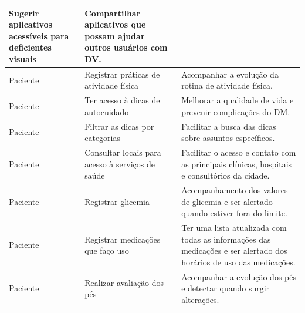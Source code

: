 \begin{quadro}[htb]
\begin{center}
\begin{tabular}{p{2.0cm}|p{5.0cm}|p{7.0cm}}
            Sugerir aplicativos acessíveis para deficientes visuais        &
            Compartilhar aplicativos que possam ajudar outros usuários com DV\@.                                                \\
            \hline
            Paciente                                                       &
            Registrar práticas de atividade física                         &
            Acompanhar a evolução da rotina de atividade física.                                                                \\
            \hline
            Paciente                                                       &
            Ter acesso à dicas de autocuidado                              &
            Melhorar a qualidade de vida e prevenir complicações do DM\@.                                                       \\
            \hline
            Paciente                                                       &
            Filtrar as dicas por categorias                                &
            Facilitar a busca das dicas sobre assuntos específicos.                                                             \\
            \hline
            Paciente                                                       &
            Consultar locais para acesso à serviços de saúde               &
            Facilitar o acesso e contato com as principais clínicas, hospitais e consultórios da cidade.                        \\
            \hline
            Paciente                                                       &
            Registrar glicemia                                             &
            Acompanhamento dos valores de glicemia e ser alertado quando estiver fora do limite.                                \\
            \hline
            Paciente                                                       &
            Registrar medicações que faço uso                              &
            Ter uma lista atualizada com todas as informações das medicações e ser alertado dos horários de uso das medicações. \\
            \hline
            Paciente                                                       &
            Realizar avaliação dos pés                                     &
            Acompanhar a evolução dos pés e detectar quando surgir alterações.                                                  \\

\end{tabular}
\end{center}
\end{quadro}
